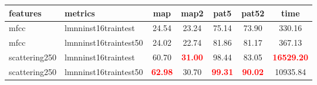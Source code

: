 \begin{tabular}{llccccc} 
features & metrics & map & map2 & pat5 & pat52 & time \\ 
\hline 
mfcc & lmnninst16traintest & 24.54 & 23.24 & 75.14 & 73.90 &   330.16 \\ 
mfcc & lmnninst16traintest50 & 24.02 & 22.74 & 81.86 & 81.17 &   367.13 \\ 
scattering250 & lmnninst16traintest & 60.70 & \textbf{\textcolor{red}{31.00}} & 98.44 & 83.05 & \textbf{\textcolor{red}{16529.20}} \\ 
scattering250 & lmnninst16traintest50 & \textbf{\textcolor{red}{62.98}} & 30.70 & \textbf{\textcolor{red}{99.31}} & \textbf{\textcolor{red}{90.02}} & 10935.84 \\ 
\end{tabular} 
